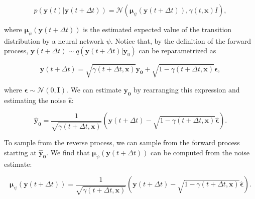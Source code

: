 \begin{equation*}
p\left(\mathbf{y}\left(t\right)\lvert\mathbf{y}\left(t+\Delta t\right)\right)=\mathcal{N}\left(\mathbf{\mu}_\psi\left(\mathbf{y}\left(t+\Delta t\right)\right),\gamma\left(t,\mathbf{x}\right)I\right),
\end{equation*}

where $\mathbf{\mu}_\psi\left(\mathbf{y}\left(t+\Delta t\right)\right)$ is the estimated expected value of the transition distribution by a neural network $\psi$. Notice that, by the definition of the forward process, $\mathbf{y}\left(t+\Delta t\right)\sim q\left(\mathbf{y}(t+\Delta t)\lvert\mathbf{y}_0\right)$ can be reparametrized as 

\begin{equation*}
\mathbf{y}\left(t+\Delta t\right)=\sqrt{\gamma\left(t+\Delta t,\mathbf{x}\right)}\mathbf{y}_\mathbf{0}+\sqrt{1-\gamma\left(t+\Delta t,\mathbf{x}\right)}\boldsymbol{\epsilon},
\end{equation*}

where $\boldsymbol{\epsilon}\sim\mathcal{N}\left(0,\mathbf{I}\right)$. We can estimate $\mathbf{y}_\mathbf{0}$ by rearranging this expression and estimating the noise $\hat{\boldsymbol{\epsilon}}$:

\begin{equation*}
{\hat{\mathbf{y}}}_\mathbf{0}=\frac{1}{\sqrt{\gamma\left(t+\Delta t,\mathbf{x}\right)}}\left(\mathbf{y}\left(t+\Delta t\right)-\sqrt{1-\gamma\left(t+\Delta t,\mathbf{x}\right)}\hat{\boldsymbol{\epsilon}}\right).
\end{equation*}

To sample from the reverse process, we can sample from the forward process starting at ${\hat{\mathbf{y}}}_\mathbf{0}$. We find that $\mathbf{\mu}_\psi\left(\mathbf{y}\left(t+\Delta t\right)\right)$ can be computed from the noise estimate:

\begin{equation*}
\mathbf{\mu}_\psi\left(\mathbf{y}\left(t+\Delta t\right)\right)=\frac{1}{\sqrt{\gamma\left(t+\Delta t,\mathbf{x}\right)}}\left(\mathbf{y}\left(t+\Delta t\right)-\sqrt{1-\gamma\left(t+\Delta t,\mathbf{x}\right)}\hat{\boldsymbol{\epsilon}}\right).
\end{equation*}




